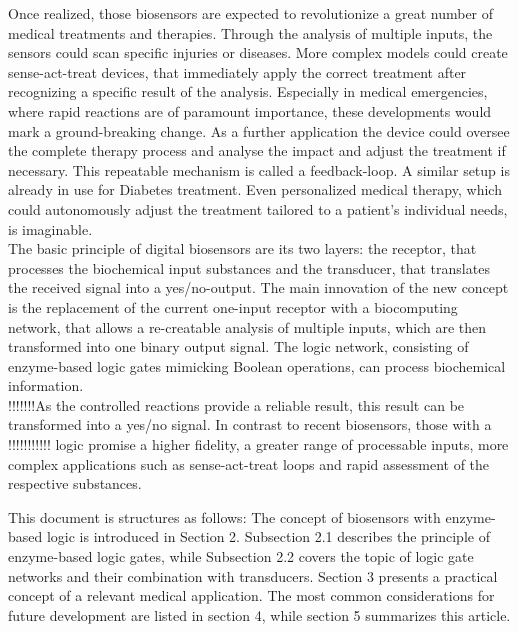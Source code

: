 \documentclass[runningheads]{llncs}
\begin{document}
	Once realized, those biosensors are expected to revolutionize a great number of medical treatments and therapies. Through the analysis of multiple inputs, the sensors could scan specific injuries or diseases. More complex models could create sense-act-treat devices, that immediately apply the correct treatment after recognizing a specific result of the analysis. Especially in medical emergencies, where rapid reactions are of paramount importance, these developments would mark a ground-breaking change. As a further application the device could oversee the complete therapy process and analyse the impact and adjust the treatment if necessary. This repeatable mechanism is called a feedback-loop. A similar setup is already in use for Diabetes treatment. Even personalized medical therapy, which could autonomously adjust the treatment tailored to a patient’s individual needs, is imaginable. \cite{original}\\
	
	The basic principle of digital biosensors are its two layers: the receptor, that processes the biochemical input substances and the transducer, that translates the received signal into a yes/no-output. The main innovation of the new concept is the replacement of the current one-input receptor with a biocomputing network, that allows a re-creatable analysis of multiple inputs, which are then transformed into one binary output signal. The logic network, consisting of enzyme-based logic gates mimicking Boolean operations, can process biochemical information.\cite{state of the art}\\ 
	 
	!!!!!!!As the controlled reactions provide a reliable result, this result can be transformed into a yes/no signal. In contrast to recent biosensors, those with a !!!!!!!!!!! logic promise a higher fidelity, a greater range of processable inputs, more complex applications such as sense-act-treat loops and rapid assessment of the respective substances.
	
	This document is structures as follows: The concept of biosensors with enzyme-based logic is introduced in Section 2. Subsection 2.1 describes the principle of enzyme-based logic gates, while Subsection 2.2 covers the topic of logic gate networks and their combination with transducers. Section 3 presents a practical concept of a relevant medical application. The most common considerations for future development are listed in section 4, while section 5 summarizes this article.
	
	
	
\end{document}
